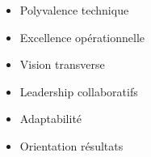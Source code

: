 %
%
%

\twocolumnsection
{
\begin{skills}
\end{skills}}
{
\vspace{1em}
\begin{itemize}
	\item Polyvalence technique
	\item Excellence opérationnelle                    
    \item Vision transverse
    \item Leadership collaboratifs
    \item Adaptabilité
    \item Orientation résultats
\end{itemize}
}

